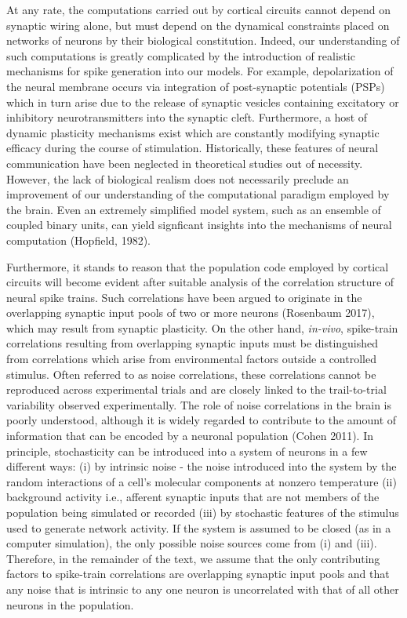 \documentclass{ucetd}
\begin{document}
At any rate, the computations carried out by cortical circuits cannot depend on synaptic wiring alone, but must depend on the dynamical constraints placed on networks of neurons by their biological constitution. Indeed, our understanding of such computations is greatly complicated by the introduction of realistic mechanisms for spike generation into our models. For example, depolarization of the neural membrane occurs via integration of post-synaptic potentials (PSPs) which in turn arise due to the release of synaptic vesicles containing excitatory or inhibitory neurotransmitters into the synaptic cleft. Furthermore, a host of dynamic plasticity mechanisms exist which are constantly modifying synaptic efficacy during the course of stimulation. Historically, these features of neural communication have been neglected in theoretical studies out of necessity. However, the lack of biological realism  does not necessarily preclude an improvement of our understanding of the computational paradigm employed by the brain. Even an extremely simplified model system, such as an ensemble of coupled binary units, can yield signficant insights into the mechanisms of neural computation (Hopfield, 1982). 

Furthermore, it stands to reason that the population code employed by cortical circuits will become evident after suitable analysis of the correlation structure of neural spike trains. Such correlations have been argued to originate in the overlapping synaptic input pools of two or more neurons (Rosenbaum 2017), which may result from synaptic plasticity. On the other hand, \emph{in-vivo}, spike-train correlations resulting from overlapping synaptic inputs must be distinguished from  correlations which arise from environmental factors outside a controlled stimulus. Often referred to as noise correlations, these correlations cannot be reproduced across experimental trials and are closely linked to the trail-to-trial variability observed experimentally. The role of noise correlations in the brain is poorly understood, although it is widely regarded to contribute to the amount of information that can be encoded by a neuronal population (Cohen 2011). In principle, stochasticity can be introduced into a system of neurons in a few different ways: (i) by intrinsic noise - the noise introduced into the system by the random interactions of a cell's molecular components at nonzero temperature (ii) background activity i.e., afferent synaptic inputs that are not members of the population being simulated or recorded (iii) by stochastic features of the stimulus used to generate network activity. If the system is assumed to be closed (as in a computer simulation), the only possible noise sources come from (i) and (iii). Therefore, in the remainder of the text, we assume that the only contributing factors to spike-train correlations are overlapping synaptic input pools and that any noise that is intrinsic to any one neuron is uncorrelated with that of all other neurons in the population.
\end{document}

